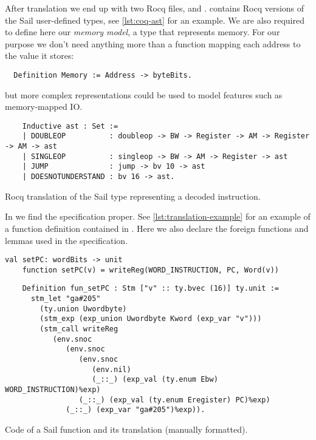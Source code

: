 After translation we end up with two Rocq files,  and .  contains Rocq versions of the Sail user-defined types, see \cref{lst:coq-ast} for an example. We are also required to define here our \emph{memory model}, \ie a type that represents memory. For our purpose we don't need anything more than a function mapping each address to the value it stores:
\begin{verbatim}
  Definition Memory := Address -> byteBits.
\end{verbatim}
but more complex representations could be used to model features such as memory-mapped IO.

\begin{listing}
  \begin{verbatim}
    Inductive ast : Set :=
    | DOUBLEOP          : doubleop -> BW -> Register -> AM -> Register -> AM -> ast
    | SINGLEOP          : singleop -> BW -> AM -> Register -> ast
    | JUMP              : jump -> bv 10 -> ast
    | DOESNOTUNDERSTAND : bv 16 -> ast.
  \end{verbatim}
  \caption{Rocq translation of the Sail type representing a decoded instruction.}
  \label{lst:coq-ast}
\end{listing}

In  we find the \usail specification proper. See \cref{lst:translation-example} for an example of a \usail function definition contained in . Here we also declare the foreign functions and lemmas used in the specification. %

\begin{listing}
  \begin{lstlisting}[language=sail]
    val setPC: wordBits -> unit
    function setPC(v) = writeReg(WORD_INSTRUCTION, PC, Word(v))
  \end{lstlisting}
  \begin{verbatim}
    Definition fun_setPC : Stm ["v" :: ty.bvec (16)] ty.unit :=
      stm_let "ga#205"
        (ty.union Uwordbyte)
        (stm_exp (exp_union Uwordbyte Kword (exp_var "v")))
        (stm_call writeReg
           (env.snoc
              (env.snoc
                 (env.snoc
                    (env.nil)
                    (_::_) (exp_val (ty.enum Ebw) WORD_INSTRUCTION)%exp)
                 (_::_) (exp_val (ty.enum Eregister) PC)%exp)
              (_::_) (exp_var "ga#205")%exp)).
  \end{verbatim}
  \caption{Code of a Sail function and its \usail translation (manually formatted).}
  \label{lst:translation-example}
\end{listing}

